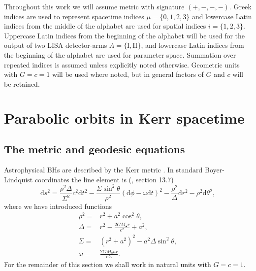 \documentclass[useAMS,usedcolumn,usegraphicx,usenatbib]{mn2e}
\newcommand{\dd}{\ensuremath{\mathrm{d}}}
\begin{document}
Throughout this work we will assume metric with signature $(+,-,-,-)$. Greek indices are used to represent spacetime indices $\mu = \{0,1,2,3\}$ and lowercase Latin indices from the middle of the alphabet are used for spatial indices $i = \{1,2,3\}$. Uppercase Latin indices from the beginning of the alphabet will be used for the output of two LISA detector-arms $A = \{\mathrm{I}, \mathrm{II}\}$, and lowercase Latin indices from the beginning of the alphabet are used for parameter space. Summation over repeated indices is assumed unless explicitly noted otherwise. Geometric units with $G = c = 1$ will be used where noted, but in general factors of $G$ and $c$ will be retained.

\section{Parabolic orbits in Kerr spacetime}\label{sec:Geodesic}

\subsection{The metric and geodesic equations}

Astrophysical BHs are described by the Kerr metric \citep{Kerr1963}. In standard Boyer-Lindquist coordinates the line element is (\citealt*{Boyer1967, Hobson2006}, section 13.7)
\begin{equation}
\dd s^2 = \frac{\rho^2 \Delta}{\Sigma^2}c^2\dd t^2 - \frac{\Sigma \sin^2 \theta}{\rho^2}\left(\dd \phi - \omega \dd t\right)^2 - \frac{\rho^2}{\Delta}\dd r^2 - \rho^2\dd \theta^2,
\end{equation}
where we have introduced functions
\begin{align}
\rho^2 = {} & r^2 + a^2\cos^2\theta,\\
\Delta = {} & r^2 - \frac{2GM_\bullet r}{c^2} + a^2,\\
\Sigma = {} & \left(r^2 +a^2\right)^2 - a^2\Delta\sin^2\theta,\\
\omega = {} & \frac{2GM_\bullet ar}{c\Sigma}.
\end{align}
For the remainder of this section we shall work in natural units with $G = c = 1$.
\end{document}
